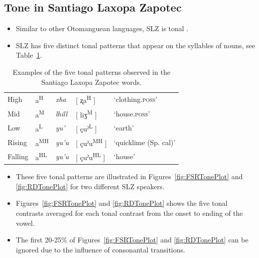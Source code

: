 \documentclass[12pt, letterpaper]{article}
\newcommand{\supr}[1]{\textsuperscript{#1}}
\providecommand{\lsptoprule}{\midrule\toprule}
\providecommand{\lspbottomrule}{\bottomrule\midrule}
\begin{document}
\subsection{Tone in Santiago Laxopa Zapotec} \label{sec:Tone}

\begin{itemize}
    \item Similar to other Otomanguean languages, SLZ is tonal \citep{suarezMesoamericanIndianLanguages1983,campbellMesoAmericaLinguisticArea1986,silvermanLaryngealComplexityOtomanguean1997,campbellOtomangueanHistoricalLinguistics2017a,campbellOtomangueanHistoricalLinguistics2017}.
    \item SLZ has five distinct tonal patterns that appear on the syllables of nouns, see Table~\ref{tab:tones}. 
\end{itemize}

\begin{table}[!h]
	\centering
	\caption{Examples of the five tonal patterns observed in the Santiago Laxopa Zapotec words.}
	\label{tab:tones}
	\begin{tabular}{lllll}
	\lsptoprule
	High   	&  a\supr{H}  &  \textit{xha}   &  [ ʐa\supr{H} ] & `clothing.\textsc{poss}'\\
	Mid    	&  a\supr{M}  &  \textit{lhill} 	& [ liʒ\supr{M} ] & `house.\textsc{poss}' \\
	Low   	&  a\supr{L}  &  \textit{yu'} 	&	 [ çuˀ\supr{L} ] & `earth'\\
	Rising	&  a\supr{MH}  &  \textit{yu'u} 	&	[ çuˀu\supr{MH} ] & `quicklime (Sp. cal)' \\
	Falling &  a\supr{HL}  &  \textit{yu'u}  &	[ çuˀu\supr{HL} ] &	`house' \\
	\lspbottomrule
	\end{tabular}
\end{table}

\begin{itemize}
	\item These five tonal patterns are illustrated in Figures~\ref{fig:FSRTonePlot} and \ref{fig:RDTonePlot} for two different SLZ speakers. 
	\item Figures~\ref{fig:FSRTonePlot} and \ref{fig:RDTonePlot} shows the five tonal contrasts averaged for each tonal contrast from the onset to ending of the vowel. 
	\item The first 20-25\% of Figures~\ref{fig:FSRTonePlot} and \ref{fig:RDTonePlot} can be ignored due to the influence of consonantal transitions. 
\end{itemize}
\end{document}
